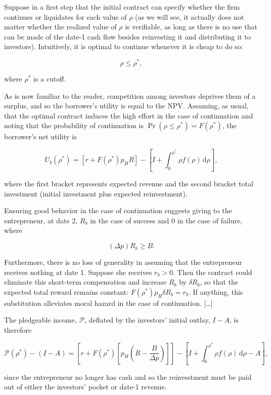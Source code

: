 \documentclass[11pt,a4paper]{article}
\begin{document}
Suppose in a first step that the initial contract can specify whether the firm continues or
liquidates for each value of \(\rho\) (as we will see, it actually does not matter whether the
realized value of \(\rho\) is verifiable, as long as there is no use that can be made of the date-1
cash flow besides reinvesting it and distributing it to investors). Intuitively, it is optimal to
continue whenever it is cheap to do so:

\[\rho \leqslant \rho^*,\]

where \(\rho^*\) is a cutoff.

As is now familiar to the reader, competition among investors deprives them of a surplus, and so the
borrower's utility is equal to the NPV. Assuming, as usual, that the optimal contract induces the
high effort in the case of continuation and noting that the probability of continuation is
\(\Pr(\rho \leqslant \rho^*) = F(\rho^*)\), the borrower's net utility is

\[U_b(\rho^*) = [r + F(\rho^*)p_HR] - \left[I + \int_0^{\rho^*}\rho f(\rho)\,\mathrm{d}\rho\right],\]

where the first bracket represents expected revenue and the second bracket total investment (initial
investment plus expected reinvestment).

Ensuring good behavior in the case of continuation suggests giving to the entrepreneur, at date 2,
\(R_b\) in the case of success and 0 in the case of failure, where

\[(\Delta p)R_b \geqslant B.\]

Furthermore, there is no loss of generality in assuming that the entrepreneur receives nothing at
date 1. Suppose she receives \(r_b > 0\). Then the contract could eliminate this short-term
compensation and increase \(R_b\) by \(\delta R_b\), so that the expected total reward remains
constant: \(F(\rho^*)p_H\delta R_b = r_b\). If anything, this substitution alleviates moral hazard
in the case of continuation. {[}\ldots{]}

The pledgeable income, \(\mathcal{P}\), deflated by the investors' initial outlay, \(I - A\), is
therefore

\[\mathcal{P}(\rho^*) - (I - A) = \left[r + F(\rho^*)\left[p_H\left(R - \frac{B}{\Delta p}\right)\right]\right] - \left[I + \int_0^{\rho^*}\rho f(\rho)\,\mathrm{d}\rho - A\right],\]

since the entrepreneur no longer has cash and so the reinvestment must be paid out of either the
investors' pocket or date-1 revenue.
\end{document}
